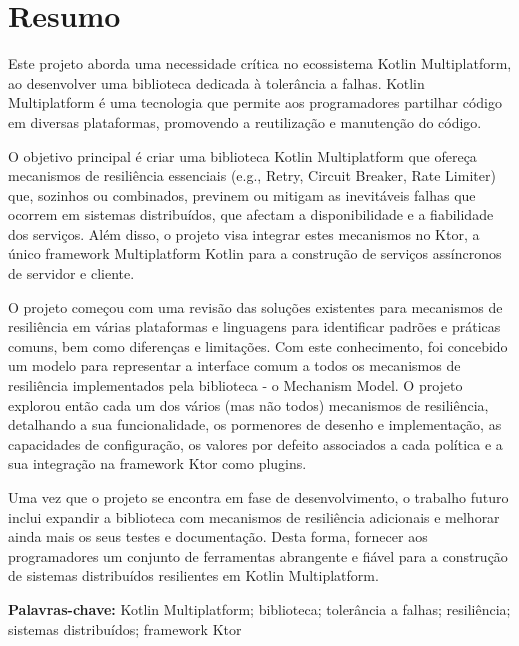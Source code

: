 \chapter*{Resumo}\label{ch:resumo}

Este projeto aborda uma necessidade crítica no ecossistema Kotlin Multiplatform,
ao desenvolver uma biblioteca dedicada à tolerância a falhas.
Kotlin Multiplatform é uma tecnologia que permite aos programadores partilhar código em diversas plataformas, promovendo a reutilização e manutenção do código.

O objetivo principal é
criar uma biblioteca Kotlin Multiplatform
que ofereça mecanismos de resiliência essenciais (e.g., Retry, Circuit Breaker, Rate Limiter)
que, sozinhos ou combinados, previnem ou mitigam as inevitáveis falhas que
ocorrem em sistemas distribuídos,
que afectam a disponibilidade e a fiabilidade dos serviços.
Além disso, o projeto visa integrar estes mecanismos no Ktor,
a único framework Multiplatform Kotlin para a construção de serviços assíncronos de servidor e cliente.

O projeto começou com uma revisão das soluções existentes para mecanismos de resiliência em várias plataformas e linguagens
para identificar padrões e práticas comuns, bem como diferenças e limitações.
Com este conhecimento,
foi concebido um modelo para representar a interface comum a todos os mecanismos de resiliência implementados pela biblioteca - o Mechanism Model.
O projeto explorou então cada um dos
vários (mas não todos) mecanismos de resiliência,
detalhando a sua funcionalidade,
os pormenores de desenho e implementação, as capacidades de configuração, os valores por defeito associados a cada política e a sua integração na framework Ktor como plugins.

Uma vez que o projeto se encontra em fase de desenvolvimento, o trabalho futuro inclui
expandir a biblioteca com mecanismos de resiliência adicionais
e melhorar ainda mais os seus testes e documentação.
Desta forma, fornecer aos programadores um conjunto de ferramentas abrangente e fiável para a construção de sistemas distribuídos resilientes
em Kotlin Multiplatform.

\textbf{Palavras-chave:} Kotlin Multiplatform; biblioteca; tolerância a falhas; resiliência; sistemas distribuídos; framework Ktor
